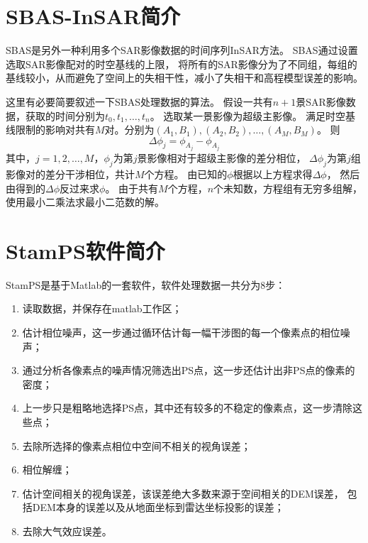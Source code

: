 \section{SBAS-InSAR简介}
SBAS是另外一种利用多个SAR影像数据的时间序列InSAR方法。
SBAS通过设置选取SAR影像配对的时空基线的上限，
将所有的SAR影像分为了不同组，每组的基线较小，从而避免了空间上的失相干性，减小了失相干和高程模型误差的影响。

这里有必要简要叙述一下SBAS处理数据的算法。
假设一共有$n+1$景SAR影像数据，获取的时间分别为$t_0,t_1,\ldots,t_n$。
选取某一景影像为超级主影像。
满足时空基线限制的影响对共有$M$对。分别为$(A_1,B_1),(A_2,B_2),\ldots,(A_M,B_M)$。
则
\begin{equation}
    \Delta\phi_j=\phi_{A_j}-\phi_{A_j}
\end{equation}
其中，$j=1,2,\ldots,M$，$\phi_j$为第$j$景影像相对于超级主影像的差分相位，
$\Delta\phi_j$为第$j$组影像对的差分干涉相位，共计$M$个方程。
由已知的$\phi$根据以上方程求得$\Delta\phi$，
然后由得到的$\Delta\phi$反过来求$\phi$。
由于共有$M$个方程，$n$个未知数，方程组有无穷多组解，使用最小二乘法求最小二范数的解。

\section{StamPS软件简介}
StamPS是基于Matlab的一套软件，软件处理数据一共分为8步：
\begin{enumerate}
    \item 读取数据，并保存在matlab工作区；
    \item 估计相位噪声，这一步通过循环估计每一幅干涉图的每一个像素点的相位噪声；
    \item 通过分析各像素点的噪声情况筛选出PS点，这一步还估计出非PS点的像素的密度；
    \item 上一步只是粗略地选择PS点，其中还有较多的不稳定的像素点，这一步清除这些点；
    \item 去除所选择的像素点相位中空间不相关的视角误差；
    \item 相位解缠；
    \item 估计空间相关的视角误差，该误差绝大多数来源于空间相关的DEM误差，
    包括DEM本身的误差以及从地面坐标到雷达坐标投影的误差；
    \item 去除大气效应误差。
\end{enumerate}